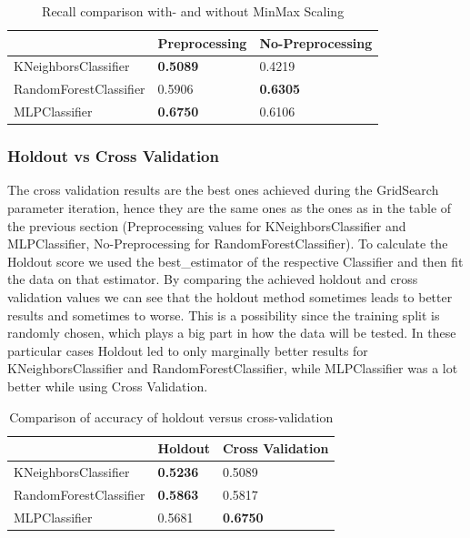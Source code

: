 
\begin{table}[h]
\begin{center}
\begin{tabular}{|l|l|l|}
\hline
                       & Preprocessing & No-Preprocessing \\ \hline
KNeighborsClassifier   & \textbf{0.5089}        & 0.4219          \\ \hline
RandomForestClassifier & 0.5906        & \textbf{0.6305}           \\ \hline
MLPClassifier          & \textbf{0.6750}        & 0.6106           \\ \hline
\end{tabular}
\caption{Recall comparison with- and without MinMax Scaling}
\label{tab:onl_pre_no_pre}
\end{center}
\end{table}

\subsubsection{Holdout vs Cross Validation}
The cross validation results are the best ones achieved during the GridSearch parameter iteration, hence they are the same ones as the ones as in the table of the previous section (Preprocessing values for KNeighborsClassifier and MLPClassifier, No-Preprocessing for RandomForestClassifier). To calculate the Holdout score we used the best\_estimator of the respective Classifier and then fit the data on that estimator.
By comparing the achieved holdout and cross validation values we can see that the holdout method sometimes leads to better results and sometimes to worse. This is a possibility since the training split is randomly chosen, which plays a big part in how the data will be tested. In these particular cases Holdout led to only marginally better results for KNeighborsClassifier and RandomForestClassifier, while MLPClassifier was a lot better while using Cross Validation.

\begin{table}[h]
\begin{center}
\begin{tabular}{|l|l|l|}
\hline
                       & Holdout & Cross Validation \\ \hline
KNeighborsClassifier   & \textbf{0.5236}  & 0.5089           \\ \hline
RandomForestClassifier & \textbf{0.5863}  & 0.5817           \\ \hline
MLPClassifier          & 0.5681  & \textbf{0.6750}           \\ \hline
\end{tabular}
\caption{Comparison of accuracy of holdout versus cross-validation}
\end{center}
\end{table}

